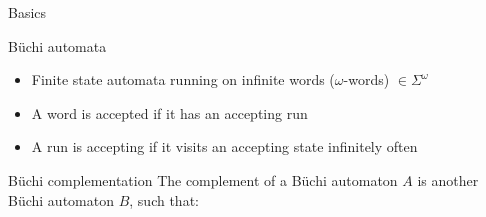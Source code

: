 \documentclass[12pt,handout]{beamer}
\begin{document}
\begin{frame}{Basics}
\begin{block}{Büchi automata}
{\hfill
{}\hfill}
\begin{itemize}
  \item Finite state automata running on infinite words ($\omega$-words) $\in \Sigma^\omega$
  \item A word is accepted if it has an accepting run
  \item A run is accepting if it visits an accepting state infinitely often
\end{itemize}
\end{block}
\pause
\begin{block}{Büchi complementation}
The complement of a Büchi automaton $A$ is another Büchi automaton $B$, such that:
\begin{quote}
\end{quote}
\end{block}
  



\end{frame}
\end{document}
